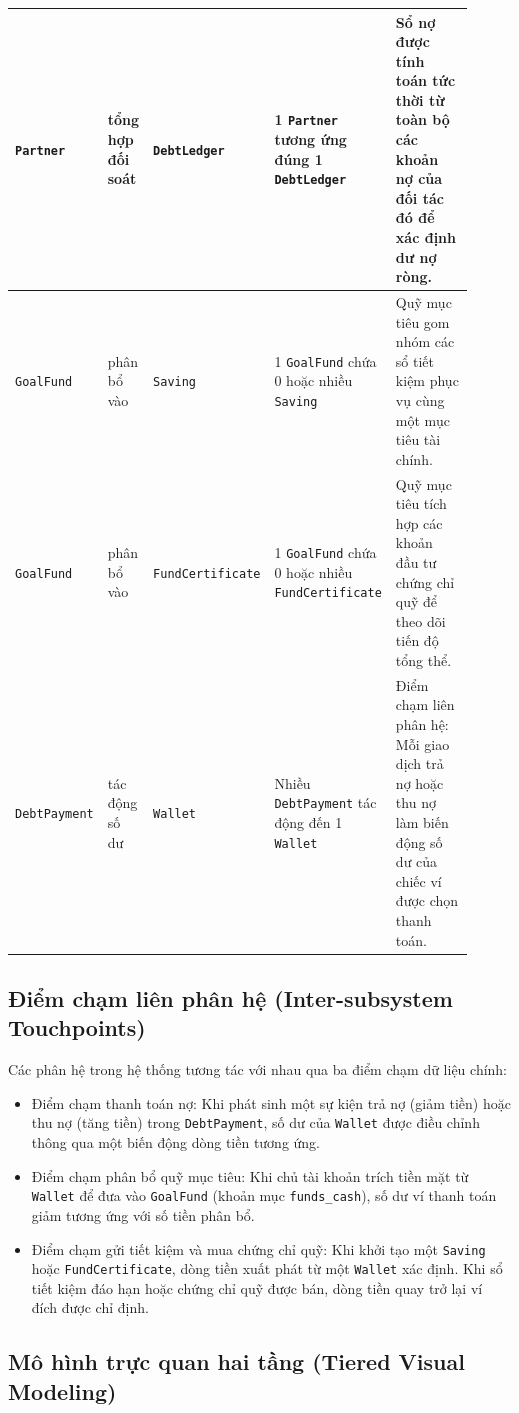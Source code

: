 \documentclass[11pt,a4paper]{article}
\newcommand{\code}[1]{\texttt{#1}}
\newenvironment{smalltable}{\begingroup\footnotesize\renewcommand{\arraystretch}{1.25}\setlength{\tabcolsep}{3pt}}{\endgroup}
\begin{document}
\begin{smalltable}
\begin{longtable}{|L{0.205\linewidth}|L{0.09\linewidth}|L{0.205\linewidth}|L{0.205\linewidth}|L{0.205\linewidth}|}
\code{Partner} & tổng hợp đối soát & \code{DebtLedger} & 1 \code{Partner} tương ứng đúng 1 \code{DebtLedger} & Sổ nợ được tính toán tức thời từ toàn bộ các khoản nợ của đối tác đó để xác định dư nợ ròng. \\ \hline
\code{GoalFund} & phân bổ vào & \code{Saving} & 1 \code{GoalFund} chứa 0 hoặc nhiều \code{Saving} & Quỹ mục tiêu gom nhóm các sổ tiết kiệm phục vụ cùng một mục tiêu tài chính. \\ \hline
\code{GoalFund} & phân bổ vào & \code{FundCertificate} & 1 \code{GoalFund} chứa 0 hoặc nhiều \code{FundCertificate} & Quỹ mục tiêu tích hợp các khoản đầu tư chứng chỉ quỹ để theo dõi tiến độ tổng thể. \\ \hline
\code{DebtPayment} & tác động số dư & \code{Wallet} & Nhiều \code{DebtPayment} tác động đến 1 \code{Wallet} & Điểm chạm liên phân hệ: Mỗi giao dịch trả nợ hoặc thu nợ làm biến động số dư của chiếc ví được chọn thanh toán. \\ \hline
\end{longtable}
\end{smalltable}

\subsection{Điểm chạm liên phân hệ (Inter-subsystem Touchpoints)}
Các phân hệ trong hệ thống tương tác với nhau qua ba điểm chạm dữ liệu chính:
\begin{itemize}
  \item Điểm chạm thanh toán nợ: Khi phát sinh một sự kiện trả nợ (giảm tiền) hoặc thu nợ (tăng tiền) trong \code{DebtPayment}, số dư của \code{Wallet} được điều chỉnh thông qua một biến động dòng tiền tương ứng.
  \item Điểm chạm phân bổ quỹ mục tiêu: Khi chủ tài khoản trích tiền mặt từ \code{Wallet} để đưa vào \code{GoalFund} (khoản mục \code{funds\_cash}), số dư ví thanh toán giảm tương ứng với số tiền phân bổ.
  \item Điểm chạm gửi tiết kiệm và mua chứng chỉ quỹ: Khi khởi tạo một \code{Saving} hoặc \code{FundCertificate}, dòng tiền xuất phát từ một \code{Wallet} xác định. Khi sổ tiết kiệm đáo hạn hoặc chứng chỉ quỹ được bán, dòng tiền quay trở lại ví đích được chỉ định.
\end{itemize}

\subsection{Mô hình trực quan hai tầng (Tiered Visual Modeling)}
\end{document}
